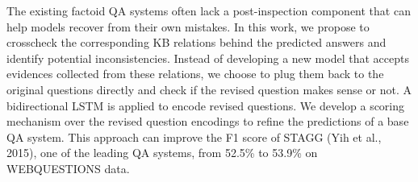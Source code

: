 The existing factoid QA systems often lack a post-inspection component that can help models recover from their own mistakes. In this work, we propose to crosscheck the corresponding KB relations behind the predicted answers and identify potential inconsistencies. Instead of developing a new model that accepts evidences collected from these relations, we choose to plug them back to the original questions directly and check if the revised question makes sense or not. A bidirectional LSTM is applied to encode revised questions. We develop a scoring mechanism over the revised question encodings to refine the predictions of a base QA system. This approach can improve the F1 score of STAGG (Yih et al., 2015), one of the leading QA systems, from 52.5\% to 53.9\% on WEBQUESTIONS data.
